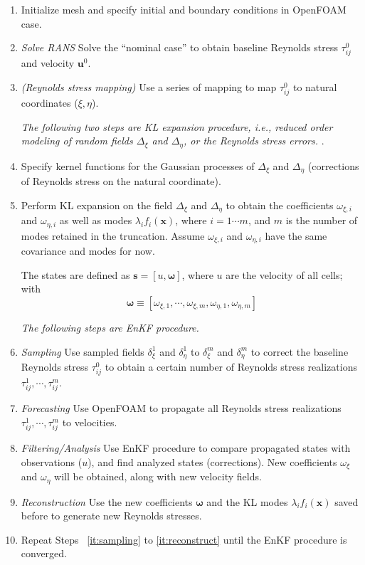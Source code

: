 \documentclass[paper = letter, fontsize = 11pt]{scrartcl} %
\begin{document}
\begin{enumerate}
\item  Initialize mesh and specify initial and boundary conditions in OpenFOAM case.
\item \emph{Solve RANS}  Solve the ``nominal case'' to obtain baseline Reynolds stress $\tau^0_{ij}$ and velocity
  $\mathbf{u}^0$.

\item \emph{(Reynolds stress mapping)} Use a series of mapping to map $\tau^0_{ij}$ to natural
  coordinates ($\xi, \eta$).


  \emph{The following two steps are KL expansion procedure, i.e., reduced order modeling of random
    fields $\Delta_\xi$ and $\Delta_\eta$, or the Reynolds stress errors.} .

\item Specify kernel functions for the Gaussian processes of $\Delta_\xi$ and $\Delta_\eta$
  (corrections of Reynolds stress on the natural coordinate).
  
\item Perform KL expansion on the field $\Delta_\xi$ and $\Delta_\eta$ to obtain the coefficients
  $\omega_{\xi, i}$ and $\omega_{\eta, i}$ as well as modes $\lambda_i f_i(\mathbf{x})$, where $i =
  1 \cdots m$, and $m$ is the number of modes retained in the truncation. Assume $\omega_{\xi, i}$
  and $\omega_{\eta, i}$ have the same covariance and modes for now.

  The states are defined as $\mathbf{s} = [u, \boldsymbol{\omega}] $, where $u$ are the velocity of
  all cells; with
\[
\boldsymbol{\omega} \equiv [\omega_{\xi, 1}, \cdots, \omega_{\xi, m}, \omega_{\eta, 1},
\omega_{\eta, m}]
\]

\emph{The following steps are EnKF procedure.}

\item \emph{Sampling} Use sampled fields $\delta^1_\xi$ and $\delta^1_\eta$ to $\delta^m_\xi$ and
  $\delta^m_\eta$ to correct the baseline Reynolds stress $\tau^0_{ij}$ to obtain a certain number
  of Reynolds stress realizations $\tau^1_{ij}, \cdots, \tau^m_{ij}$. \label{it:sampling}

\item \emph{Forecasting} Use OpenFOAM to propagate all Reynolds stress realizations $\tau^1_{ij}, \cdots,
  \tau^m_{ij}$ to velocities. \label{it:solveRans}

\item \emph{Filtering/Analysis} Use EnKF procedure to compare propagated states with observations ($u$), and
  find analyzed states (corrections). New coefficients $\omega_\xi$ and $\omega_\eta$ will be
  obtained, along with new velocity fields. \label{it:analysis}

\item \emph{Reconstruction} Use the new coefficients $\boldsymbol{\omega}$ and the KL modes
  $\lambda_i f_i(\mathbf{x})$ saved before to generate new Reynolds stresses. \label{it:reconstruct}

\item Repeat Steps ~\ref{it:sampling} to \ref{it:reconstruct} until the EnKF procedure is converged.

\end{enumerate}
\end{document}
